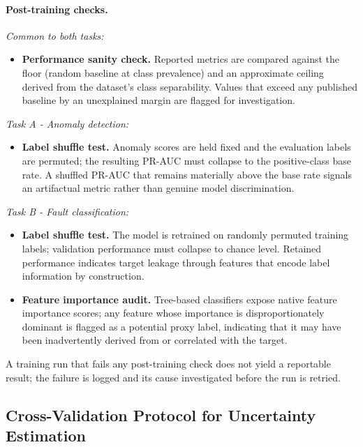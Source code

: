 \paragraph{Post-training checks.}\leavevmode

\medskip
\noindent\textit{Common to both tasks:}
\begin{itemize}
    \item \textbf{Performance sanity check.} Reported metrics are compared against the floor (random baseline at class prevalence) and an approximate ceiling derived from the dataset's class separability. Values that exceed any published baseline by an unexplained margin are flagged for investigation.
\end{itemize}

\noindent\textit{Task A - Anomaly detection:}
\begin{itemize}
    \item \textbf{Label shuffle test.} Anomaly scores are held fixed and the evaluation labels are permuted; the resulting PR-AUC must collapse to the positive-class base rate. A shuffled PR-AUC that remains materially above the base rate signals an artifactual metric rather than genuine model discrimination.
\end{itemize}

\noindent\textit{Task B - Fault classification:}
\begin{itemize}
    \item \textbf{Label shuffle test.} The model is retrained on randomly permuted training labels; validation performance must collapse to chance level. Retained performance indicates target leakage through features that encode label information by construction.
    \item \textbf{Feature importance audit.} Tree-based classifiers expose native feature importance scores; any feature whose importance is disproportionately dominant is flagged as a potential proxy label, indicating that it may have been inadvertently derived from or correlated with the target.
\end{itemize}

A training run that fails any post-training check does not yield a reportable result; the failure is logged and its cause investigated before the run is retried.

\subsection{Cross-Validation Protocol for Uncertainty Estimation}

